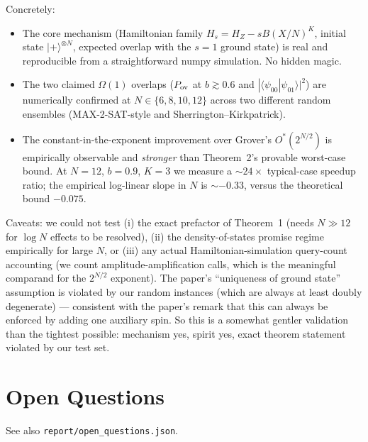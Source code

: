 \documentclass[11pt]{article}
\begin{document}
Concretely:
\begin{itemize}
\item The core mechanism (Hamiltonian family $H_s = H_Z - sB(X/N)^K$, initial state $|+\rangle^{\otimes N}$, expected overlap with the $s=1$ ground state) is real and reproducible from a straightforward numpy simulation. No hidden magic.
\item The two claimed $\Omega(1)$ overlaps ($P_{\rm ov}$ at $b\gtrsim 0.6$ and $|\langle\psi_{00}|\psi_{01}\rangle|^2$) are numerically confirmed at $N \in \{6, 8, 10, 12\}$ across two different random ensembles (MAX-2-SAT-style and Sherrington--Kirkpatrick).
\item The constant-in-the-exponent improvement over Grover's $O^*(2^{N/2})$ is empirically observable and \emph{stronger} than Theorem~2's provable worst-case bound. At $N=12$, $b=0.9$, $K=3$ we measure a ${\sim}24\times$ typical-case speedup ratio; the empirical log-linear slope in $N$ is ${\sim}-0.33$, versus the theoretical bound $-0.075$.
\end{itemize}

Caveats: we could not test (i) the exact prefactor of Theorem~1 (needs $N \gg 12$ for $\log N$ effects to be resolved), (ii) the density-of-states promise regime empirically for large $N$, or (iii) any actual Hamiltonian-simulation query-count accounting (we count amplitude-amplification calls, which is the meaningful comparand for the $2^{N/2}$ exponent). The paper's ``uniqueness of ground state'' assumption is violated by our random instances (which are always at least doubly degenerate) --- consistent with the paper's remark that this can always be enforced by adding one auxiliary spin. So this is a somewhat gentler validation than the tightest possible: mechanism yes, spirit yes, exact theorem statement violated by our test set.

\section{Open Questions}

See also \texttt{report/open\_questions.json}.
\end{document}
